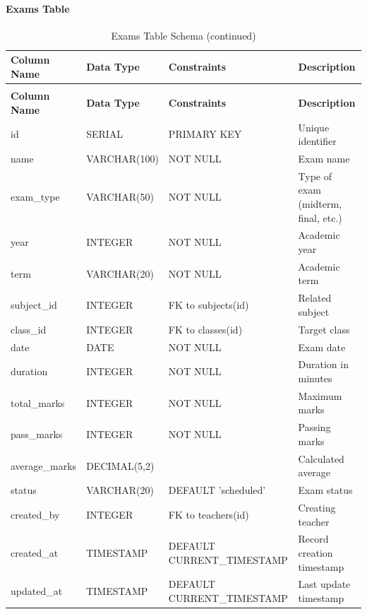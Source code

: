 \documentclass[12pt,a4paper]{report}
\begin{document}
\paragraph{Exams Table}
\begin{longtable}{|p{3cm}|p{3cm}|p{2cm}|p{6cm}|}
\caption{Exams Table Schema}
\label{tab:exams}\\
\hline
\textbf{Column Name} & \textbf{Data Type} & \textbf{Constraints} & \textbf{Description} \\
\hline
\endfirsthead
\caption[]{Exams Table Schema (continued)}\\
\hline
\textbf{Column Name} & \textbf{Data Type} & \textbf{Constraints} & \textbf{Description} \\
\hline
\endhead
id & SERIAL & PRIMARY KEY & Unique identifier \\
\hline
name & VARCHAR(100) & NOT NULL & Exam name \\
\hline
exam\_type & VARCHAR(50) & NOT NULL & Type of exam (midterm, final, etc.) \\
\hline
year & INTEGER & NOT NULL & Academic year \\
\hline
term & VARCHAR(20) & NOT NULL & Academic term \\
\hline
subject\_id & INTEGER & FK to subjects(id) & Related subject \\
\hline
class\_id & INTEGER & FK to classes(id) & Target class \\
\hline
date & DATE & NOT NULL & Exam date \\
\hline
duration & INTEGER & NOT NULL & Duration in minutes \\
\hline
total\_marks & INTEGER & NOT NULL & Maximum marks \\
\hline
pass\_marks & INTEGER & NOT NULL & Passing marks \\
\hline
average\_marks & DECIMAL(5,2) & & Calculated average \\
\hline
status & VARCHAR(20) & DEFAULT 'scheduled' & Exam status \\
\hline
created\_by & INTEGER & FK to teachers(id) & Creating teacher \\
\hline
created\_at & TIMESTAMP & DEFAULT CURRENT\_TIMESTAMP & Record creation timestamp \\
\hline
updated\_at & TIMESTAMP & DEFAULT CURRENT\_TIMESTAMP & Last update timestamp \\
\hline
\end{longtable}
\end{document}

